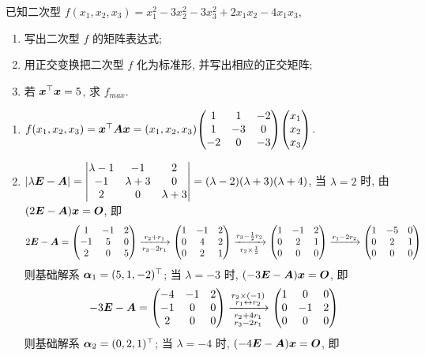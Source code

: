 \begin{example}
    已知二次型 $f(x_1,x_2,x_3)=x_1^2-3x_2^2-3x_3^2+2x_1x_2-4x_1x_3$,
    \begin{enumerate}[label=(\arabic{*})]
        \item 写出二次型 $f$ 的矩阵表达式;
        \item 用正交变换把二次型 $f$ 化为标准形, 并写出相应的正交矩阵;
        \item 若 $\vb*{x}^\top\vb*{x}=5$, 求 $f_{max}.$
    \end{enumerate}
\end{example}
\begin{solution}
    \begin{enumerate}[label=(\arabic{*})]
        \item $f(x_1,x_2,x_3)=\vb*{x}^\top\vb*{Ax}=(x_1,x_2,x_3)\mqty(1&1&-2\\1&-3&0\\-2&0&-3)\mqty(x_1\\x_2\\x_3)$.
        \item $|\lambda\vb*{E}-\vb*{A}|=\mqty|\lambda-1&-1&2\\-1&\lambda+3&0\\2&0&\lambda+3|=(\lambda-2)(\lambda+3)(\lambda+4)$, 当 $\lambda=2$ 时, 由 $(2\vb*{E}-\vb*{A})\vb*{x}=\vb*{O}$, 即
              $$2\vb*{E}-\vb*{A}=\mqty(1&-1&2\\-1&5&0\\2&0&5)\xrightarrow[r_3-2r_1]{r_2+r_1}\mqty(1&-1&2\\0&4&2\\0&2&1)\xrightarrow[r_2\times\frac{1}{2}]{r_3-\frac{1}{2}r_2}\mqty(1&-1&2\\0&2&1\\0&0&0)\xrightarrow{r_1-2r_2}\mqty(1&-5&0\\0&2&1\\0&0&0)$$
              则基础解系 $\vb*{\alpha}_1=(5,1,-2)^\top$; 当 $\lambda=-3$ 时, $(-3\vb*{E}-\vb*{A})\vb*{x}=\vb*{O}$, 即
              $$-3\vb*{E}-\vb*{A}=\mqty(-4&-1&2\\-1&0&0\\2&0&0)\xrightarrow[\substack{r_2+4r_1\\r_3-2r_1}]{\substack{r_2\times(-1)\\r_1\leftrightarrow r_2}}\mqty(1&0&0\\0&-1&2\\0&0&0)$$
              则基础解系 $\vb*{\alpha}_2=(0,2,1)^\top$; 当 $\lambda=-4$ 时, $(-4\vb*{E}-\vb*{A})\vb*{x}=\vb*{O}$, 即

\end{enumerate}
\end{solution}
